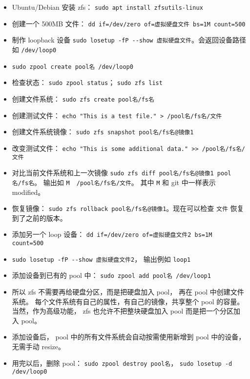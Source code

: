 
\begin{issues}
\issueDraft
\end{issues}

\begin{itemize}
\item Ubuntu/Debian 安装 zfs： \verb|sudo apt install zfsutils-linux|
\item 创建一个 500MB 文件： \verb|dd if=/dev/zero of=虚拟硬盘文件 bs=1M count=500|
\item 制作 loopback 设备 \verb|sudo losetup -fP --show 虚拟硬盘文件|。会返回设备路径如 \verb|/dev/loop0|
\item \verb|sudo zpool create pool名 /dev/loop0|
\item 检查状态： \verb|sudo zpool status|； \verb|sudo zfs list|
\item 创建文件系统： \verb|sudo zfs create pool名/fs名|
\item 创建测试文件： \verb|echo "This is a test file." > /pool名/fs名/文件|
\item 创建文件系统镜像： \verb|sudo zfs snapshot pool名/fs名@镜像1|
\item 改变测试文件： \verb|echo "This is some additional data." >> /pool名/fs名/文件|
\item 对比当前文件系统和上一次镜像 \verb|sudo zfs diff pool名/fs名@镜像1 pool名/fs名|。 输出如 \verb|M	/pool名/fs名/文件|。 其中 \verb|M| 和 git 中一样表示 modified。
\item 恢复镜像： \verb|sudo zfs rollback pool名/fs名@镜像1|。现在可以检查 \verb|文件| 恢复到了之前的版本。
\item 添加另一个 loop 设备： \verb|dd if=/dev/zero of=虚拟硬盘文件2 bs=1M count=500|
\item \verb|sudo losetup -fP --show 虚拟硬盘文件2|， 输出例如 \verb|loop1|
\item 添加设备到已有的 pool 中： \verb|sudo zpool add pool名 /dev/loop1|
\item 所以 zfs 不需要再给硬盘分区，而是把硬盘加入 pool， 再在 pool 中创建文件系统。 每个文件系统有自己的属性，有自己的镜像，共享整个 pool 的容量。 当然，作为高级功能， zfs 也允许不把整块硬盘加入 pool 而是把一个分区加入 pool。
\item 添加设备后， pool 中的所有文件系统会自动按需使用新增到 pool 中的设备，无需手动 resize。
\item 用完以后，删除 pool： \verb|sudo zpool destroy pool名|， \verb|sudo losetup -d /dev/loop0|
\end{itemize}

